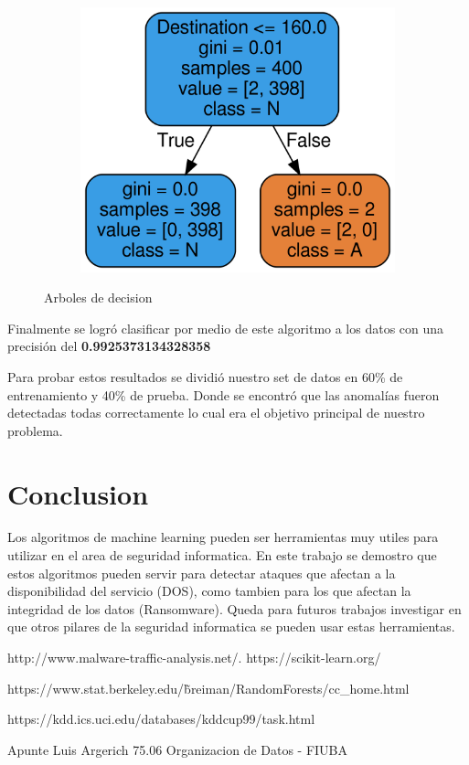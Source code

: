 \documentclass[a4paper,10pt]{article}
\begin{document}
\begin{figure}[!hbp]
\begin{subfigure}{.5\textwidth}
\end{subfigure}
\begin{subfigure}{.5\textwidth}
  \centering
  \includegraphics[width=.8\linewidth]{Wireshark/Tres/6.png}
  \caption{}
  \label{fig:sfig2}
\end{subfigure}

\caption{Arboles de decision}
\label{fig:fig}
\end{figure}

Finalmente se logró clasificar por medio de este algoritmo a los datos con una precisión del \textbf{0.9925373134328358}

\medskip

\normalsize Para probar estos resultados se dividió nuestro set de datos en 60\% de entrenamiento y 40\% de prueba. Donde se encontró que las anomalías fueron detectadas todas correctamente lo cual era el objetivo principal de nuestro problema.


\section{Conclusion}

Los algoritmos de machine learning pueden ser herramientas muy utiles para utilizar en el area de seguridad informatica. En este trabajo se demostro que estos algoritmos pueden servir para detectar ataques que afectan a la disponibilidad del servicio (DOS), como tambien para los que afectan la integridad de los datos (Ransomware). Queda para futuros trabajos investigar en que otros pilares de la seguridad informatica se pueden usar estas herramientas.
\newpage



\begin{thebibliography}{9}
  http://www.malware-traffic-analysis.net/.
 https://scikit-learn.org/

 https://www.stat.berkeley.edu/\~breiman/RandomForests/cc\_home.html

 https://kdd.ics.uci.edu/databases/kddcup99/task.html


 Apunte Luis Argerich 75.06 Organizacion de Datos - FIUBA
\end{thebibliography}
\end{document}
